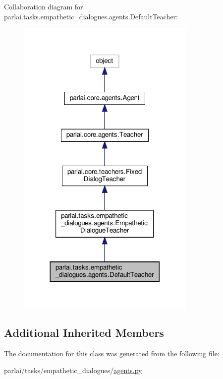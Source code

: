 Collaboration diagram for parlai.\+tasks.\+empathetic\+\_\+dialogues.\+agents.\+Default\+Teacher\+:
\nopagebreak
\begin{figure}[H]
\begin{center}
\leavevmode
\includegraphics[width=245pt]{classparlai_1_1tasks_1_1empathetic__dialogues_1_1agents_1_1DefaultTeacher__coll__graph}
\end{center}
\end{figure}
\subsection*{Additional Inherited Members}


The documentation for this class was generated from the following file\+:\begin{DoxyCompactItemize}
\item 
parlai/tasks/empathetic\+\_\+dialogues/\hyperlink{parlai_2tasks_2empathetic__dialogues_2agents_8py}{agents.\+py}\end{DoxyCompactItemize}
